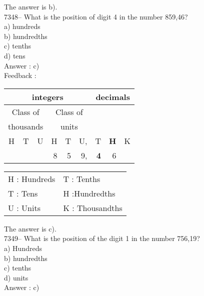 \documentclass[letterpaper, 12pt]{article}
\begin{document}
\normalsize
The answer is b).\\


7348-- What is the position of digit 4 in the number 859,46?\\

a) hundreds\\
b) hundredths\\
c) tenths\\
d) tens\\

Answer : c)\\

Feedback :\\
\begin{center}
\begin{tabular}{|rrr|rrr|rrr|}
\hline
\multicolumn{6}{|c|}{integers} &\multicolumn{3}{|c|}{decimals} \\
\hline
\multicolumn{3}{|c|}{Class of} &\multicolumn{3}{|c|}{Class of} &  \multicolumn{3}{c|}{} \\
\multicolumn{3}{|c|}{thousands} &\multicolumn{3}{|c|}{units} &  \multicolumn{3}{c|}{} \\
\hline
H & T & U &H & T & U, & T\up{th} & \textbf{H\up{th}} & K\up{th} \\
\hline
\hline
 & & & 8 & 5 & 9, & \textbf{4} & 6 & \\
\hline
\end{tabular}
\end{center}

\scriptsize
\begin{center}
\begin{tabular}{ll}
H : Hundreds & T\up{th} : Tenths\\
T : Tens & H\up{th} :Hundredths\\
U : Units & K\up{e} : Thousandths\\
\end{tabular}
\end{center}

\normalsize
The answer is c).\\

7349-- What is the position of the digit 1 in the number 756,19?\\

a) Hundreds\\
b) hundredths\\
c) tenths\\
d) units\\

Answer : c)\\
\end{document}
